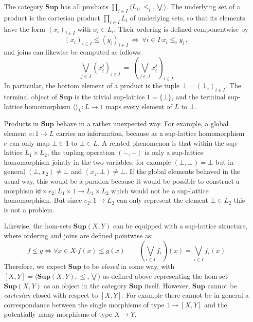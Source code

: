 \documentclass[11pt,oneside,draft]{book}
\theoremstyle{definition}
\newcommand{\kw}[1]{\ensuremath{ \mathsf{#1} }}
\newcommand{\bdot}{\boldsymbol{\cdot}}
\begin{document}
The category $\mathbf{Sup}$ has all products
$\prod_{i \in I} \langle L_i, {\le_i}, \bigvee \rangle$.
The underlying set of a product
is the cartesian product $\prod_{i \in I} L_i$
of underlying sets,
so that its elements have the form $(x_i)_{i \in I}$
with $x_i \in L_i$.
Their ordering is defined componentwise by
\[
  (x_i)_{i \in I} \le (y_i)_{i \in I}
  \: \Leftrightarrow \:
  \forall i \in I \bdot x_i \le_i y_i
  \,,
\]
and joins can likewise be computed as follows:
\[
  \bigvee_{j \in J} (x_i^j)_{i \in I}
  \: = \:
  \left( \bigvee_{j \in J} x_i^j \right)_{i \in I}
\]
In particular,
the bottom element of a product
is the tuple $\bot = (\bot_i)_{i \in I}$.
The terminal object
of $\mathbf{Sup}$ is the trivial sup-lattice $1 = \{ \bot \}$,
and the terminal sup-lattice homomorphism
$\langle \rangle_L : L \rightarrow 1$
maps every element of $L$ to $\bot$.

Products in $\mathbf{Sup}$
behave in a rather unexpected way.
For example,
a global element $e : 1 \rightarrow L$
carries no information,
because as a sup-lattice homomorphism $e$
can only map $\bot \in 1$ to $\bot \in L$.
A related phenomenon is that
within the sup-lattice $L_1 \times L_2$,
the tupling operation $(-, -)$
is only a sup-lattice homomorphism
jointly in the two variables:
for example $(\bot, \bot) = \bot$
but in general $(\bot, x_2) \ne \bot$ and $(x_1, \bot) \ne \bot$.
If the global elements behaved in the usual way,
this would be a paradox because
it would be possible to construct a morphism
$\kw{id} \times e_2 : L_1 \times 1 \rightarrow L_1 \times L_2$
which would not be a sup-lattice homomorphism.
But since $e_2 : 1 \rightarrow L_2$
can only represent the element $\bot \in L_2$
this is not a problem.

Likewise,
the hom-sets $\mathbf{Sup}(X, Y)$
can be equipped with a sup-lattice structure,
where ordering and joins are defined pointwise as:
\[
  f \le g \Leftrightarrow \forall x \in X \bdot f(x) \le g(x)
  \qquad
  \left( \bigvee_{i \in I} f_i \right)(x) = \bigvee_{i \in I} f_i(x)
\]
Therefore,
we expect $\mathbf{Sup}$
to be \emph{closed} in some way, with
$[X, Y] = \langle \mathbf{Sup}(X, Y), {\le}, {\bigvee} \rangle$
as defined above representing the hom-set
$\mathbf{Sup}(X, Y)$ as an object in the category $\mathbf{Sup}$ itself.
However,
$\mathbf{Sup}$ cannot be \emph{cartesian} closed
with respect to $[X, Y]$.
For example there cannot be in general
a correspondance between the single morphisms of type
$1 \rightarrow [X, Y]$
and the potentially many morphisms of type
$X \rightarrow Y$.
\end{document}
